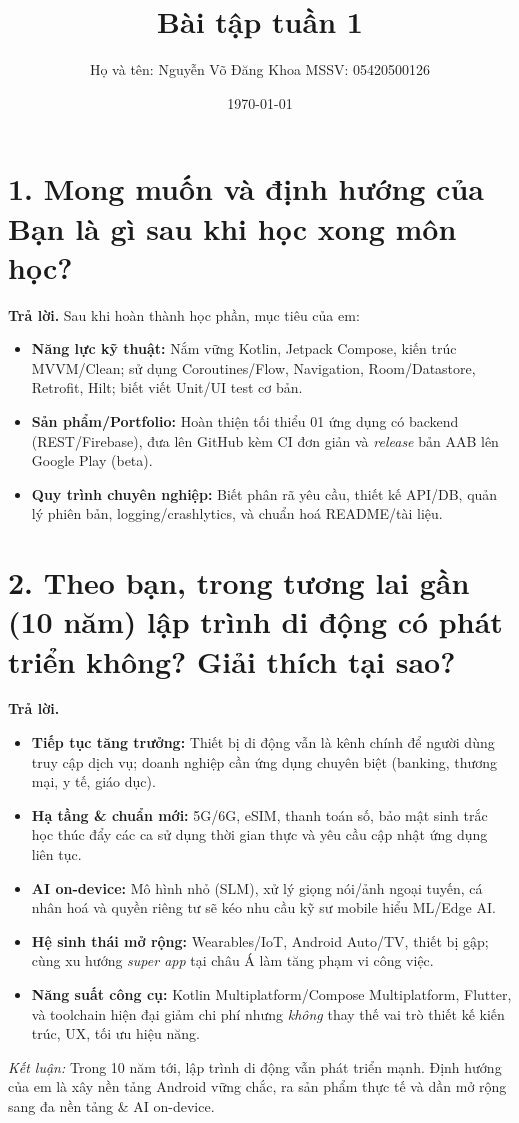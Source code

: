 \documentclass[12pt,a4paper]{article}
\title{Bài tập tuần 1}
\author{Họ và tên: Nguyễn Võ Đăng Khoa \quad MSSV: 05420500126}
\date{\today}
\begin{document}
\maketitle

\section*{1. Mong muốn và định hướng của Bạn là gì sau khi học xong môn học?}
\textbf{Trả lời.}
Sau khi hoàn thành học phần, mục tiêu của em:
\begin{itemize}
  \item \textbf{Năng lực kỹ thuật:} Nắm vững Kotlin, Jetpack Compose, kiến trúc MVVM/Clean; sử dụng Coroutines/Flow, Navigation, Room/Datastore, Retrofit, Hilt; biết viết Unit/UI test cơ bản.
  \item \textbf{Sản phẩm/Portfolio:} Hoàn thiện tối thiểu 01 ứng dụng có backend (REST/Firebase), đưa lên GitHub kèm CI đơn giản và \emph{release} bản AAB lên Google Play (beta).
  \item \textbf{Quy trình chuyên nghiệp:} Biết phân rã yêu cầu, thiết kế API/DB, quản lý phiên bản, logging/crashlytics, và chuẩn hoá README/tài liệu.
\end{itemize}

\section*{2. Theo bạn, trong tương lai gần (10 năm) lập trình di động có phát triển không? Giải thích tại sao?}
\textbf{Trả lời.}
\begin{itemize}
  \item \textbf{Tiếp tục tăng trưởng:} Thiết bị di động vẫn là kênh chính để người dùng truy cập dịch vụ; doanh nghiệp cần ứng dụng chuyên biệt (banking, thương mại, y tế, giáo dục).
  \item \textbf{Hạ tầng \& chuẩn mới:} 5G/6G, eSIM, thanh toán số, bảo mật sinh trắc học thúc đẩy các ca sử dụng thời gian thực và yêu cầu cập nhật ứng dụng liên tục.
  \item \textbf{AI on-device:} Mô hình nhỏ (SLM), xử lý giọng nói/ảnh ngoại tuyến, cá nhân hoá và quyền riêng tư sẽ kéo nhu cầu kỹ sư mobile hiểu ML/Edge AI.
  \item \textbf{Hệ sinh thái mở rộng:} Wearables/IoT, Android Auto/TV, thiết bị gập; cùng xu hướng \textit{super app} tại châu Á làm tăng phạm vi công việc.
  \item \textbf{Năng suất công cụ:} Kotlin Multiplatform/Compose Multiplatform, Flutter, và toolchain hiện đại giảm chi phí nhưng \emph{không} thay thế vai trò thiết kế kiến trúc, UX, tối ưu hiệu năng.
\end{itemize}

\bigskip
\noindent\textit{Kết luận:} Trong 10 năm tới, lập trình di động vẫn phát triển mạnh. Định hướng của em là xây nền tảng Android vững chắc, ra sản phẩm thực tế và dần mở rộng sang đa nền tảng \& AI on-device.
\end{document}
